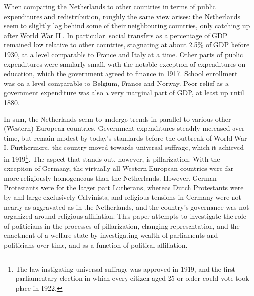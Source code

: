     When comparing the Netherlands to other countries in terms of public expenditures and redistribution, roughly the same view arises: the Netherlands seem to slightly lag behind some of their neighbouring countries, only catching up after World War II \autocite{lindert2004growing}. In particular, social transfers as a percentage of GDP remained low relative to other countries, stagnating at about 2.5\% of GDP before 1930, at a level comparable to France and Italy at a time. Other parts of public expenditures were similarly small, with the notable exception of expenditures on education, which the government agreed to finance in 1917. School enrollment was on a level comparable to Belgium, France and Norway. Poor relief as a government expenditure was also a very marginal part of GDP, at least up until 1880. \autocite{van2000eenheiddstaat, lindert2004growing}

    In sum, the Netherlands seem to undergo trends in parallel to various other (Western) European countries. Government expenditures steadily increased over time, but remain modest by today's standards before the outbreak of World War I. Furthermore, the country moved towards universal suffrage, which it achieved in 1919\footnote{The law instigating universal suffrage was approved in 1919, and the first parliamentary election in which every citizen aged 25 or older could vote took place in 1922.}. The aspect that stands out, however, is pillarization. With the exception of Germany, the virtually all Western European countries were far more religiously homogeneous than the Netherlands. However, German Protestants were for the larger part Lutherans, whereas Dutch Protestants were by and large exclusively Calvinists, and religious tensions in Germany were not nearly as aggravated as in the Netherlands, and the country's governance was not organized around religious affiliation. This paper attempts to investigate the role of politicians in the processes of pillarization, changing representation, and the enactment of a welfare state by investigating wealth of parliaments and politicians over time, and as a function of political affiliation.

